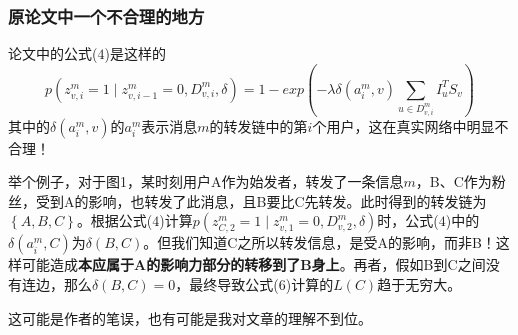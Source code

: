 \documentclass[UTF8]{ctexart}
\begin{document}
\subsubsection*{原论文中一个不合理的地方}
\par 论文中的公式($4$)是这样的
\begin{equation*}
p(z_{v,i}^{m}=1 \mid z_{v,i-1}^{m}=0,D_{v,i}^{m},\delta)=1-exp(-\lambda \delta(a_{i}^{m},v)\sum _{u \in D_{v,i}^{m}}I_{u}^{T}S_{v})
\end{equation*}
其中的$\delta(a_{i}^{m},v)$的$a_{i}^{m}$表示消息$m$的转发链中的第$i$个用户，这在真实网络中明显不合理！
\par 举个例子，对于图1，某时刻用户A作为始发者，转发了一条信息$m$，B、C作为粉丝，受到A的影响，也转发了此消息，且B要比C先转发。此时得到的转发链为$\left \{ A,B,C \right \}$。根据公式($4$)计算$p(z_{C,2}^{m}=1 \mid z_{v,1}^{m}=0,D_{v,2}^{m},\delta)$时，公式($4$)中的$\delta(a_{i}^{m},C)$为$\delta(B,C)$。但我们知道C之所以转发信息，是受A的影响，而非B！这样可能造成\textbf{本应属于A的影响力部分的转移到了B身上}。再者，假如B到C之间没有连边，那么$\delta(B,C)=0$，最终导致公式($6$)计算的$L(C)$趋于无穷大。
\par 这可能是作者的笔误，也有可能是我对文章的理解不到位。
\newline
\par {}
\end{document}
